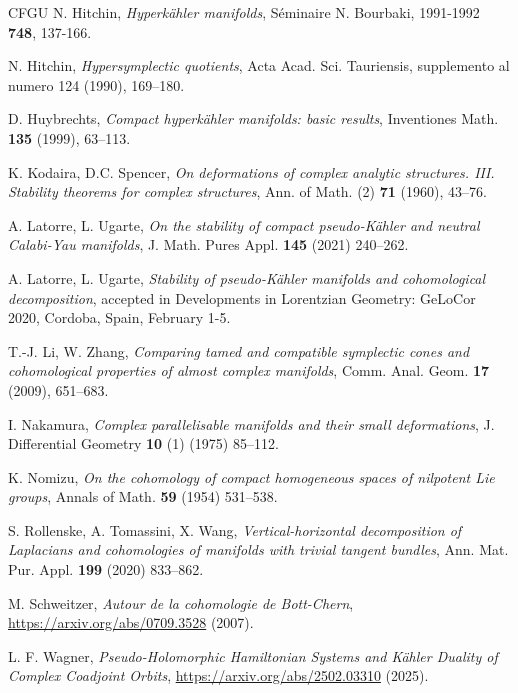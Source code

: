 \documentclass[a4paper]{amsart}
\theoremstyle{definition}
\theoremstyle{remark}
\numberwithin{equation}{section}
\begin{document}
\begin{thebibliography}{CFGU}
 N. Hitchin, {\it Hyperkähler manifolds}, Séminaire N. Bourbaki, 1991-1992 {\bf 748}, 137-166.

 N. Hitchin, {\it Hypersymplectic quotients}, Acta Acad. Sci. Tauriensis, supplemento al numero 124 (1990), 169--180.

 D. Huybrechts, {\it Compact hyperkähler manifolds: basic results}, Inventiones Math. {\bf 135} (1999), 63--113.

 K. Kodaira, D.C. Spencer, {\it On deformations of complex analytic structures. III. Stability theorems for complex structures}, Ann. of Math. (2) {\bf 71} (1960), 43--76.

 A. Latorre, L. Ugarte, {\it On the stability of compact pseudo-K\"ahler and neutral Calabi-Yau manifolds}, J. Math. Pures Appl. {\bf 145} (2021) 240--262.

 A. Latorre, L. Ugarte, {\it Stability of pseudo-K\"ahler manifolds and cohomological decomposition}, accepted in Developments in Lorentzian Geometry: GeLoCor 2020, Cordoba, Spain, February 1-5.

 T.-J. Li, W. Zhang, {\it Comparing tamed and compatible symplectic cones and cohomological properties of almost complex manifolds}, Comm. Anal. Geom. {\bf 17} (2009), 651--683.

 I. Nakamura, {\it Complex parallelisable manifolds and their small deformations}, J. Differential Geometry {\bf 10} (1) (1975) 85--112.

 K. Nomizu, {\it On the cohomology of compact homogeneous spaces of nilpotent Lie groups}, Annals of Math. {\bf 59} (1954) 531--538.

 S. Rollenske, A. Tomassini, X. Wang, {\it Vertical-horizontal decomposition of Laplacians and cohomologies of manifolds with trivial tangent bundles}, Ann. Mat. Pur. Appl. {\bf 199} (2020) 833--862.

 M. Schweitzer, {\it Autour de la cohomologie de Bott-Chern}, \url{https://arxiv.org/abs/0709.3528} (2007).

 L. F. Wagner, {\it Pseudo-Holomorphic Hamiltonian Systems and Kähler Duality of Complex Coadjoint Orbits}, \url{https://arxiv.org/abs/2502.03310} (2025).

\end{thebibliography}
\end{document}
